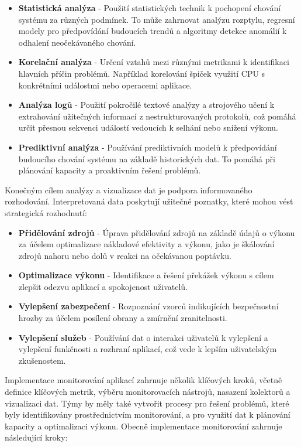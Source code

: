 \begin{itemize}
    \item \textbf{Statistická analýza} - Použití statistických technik k pochopení chování systému za různých podmínek. To může zahrnovat analýzu rozptylu, regresní modely pro předpovídání budoucích trendů a algoritmy detekce anomálií k odhalení neočekávaného chování.
    \item \textbf{Korelační analýza} - Určení vztahů mezi různými metrikami k identifikaci hlavních příčin problémů. Například korelování špiček využití CPU s konkrétními událostmi nebo operacemi aplikace.
    \item \textbf{Analýza logů} - Použití pokročilé textové analýzy a strojového učení k extrahování užitečných informací z nestrukturovaných protokolů, což pomáhá určit přesnou sekvenci událostí vedoucích k selhání nebo snížení výkonu.
    \item \textbf{Prediktivní analýza} - Používání prediktivních modelů k předpovídání budoucího chování systému na základě historických dat. To pomáhá při plánování kapacity a proaktivním řešení problémů.
\end{itemize}


Konečným cílem analýzy a vizualizace dat je podpora informovaného rozhodování. Interpretovaná data poskytují užitečné poznatky, které mohou vést strategická rozhodnutí:

\begin{itemize}
    \item \textbf{Přidělování zdrojů} - Úprava přidělování zdrojů na základě údajů o výkonu za účelem optimalizace nákladové efektivity a výkonu, jako je škálování zdrojů nahoru nebo dolů v reakci na očekávanou poptávku.
    \item \textbf{Optimalizace výkonu} - Identifikace a řešení překážek výkonu s cílem zlepšit odezvu aplikací a spokojenost uživatelů.
    \item \textbf{Vylepšení zabezpečení} - Rozpoznání vzorců indikujících bezpečnostní hrozby za účelem posílení obrany a zmírnění zranitelnosti.
    \item \textbf{Vylepšení služeb} - Používání dat o interakci uživatelů k vylepšení a vylepšení funkčnosti a rozhraní aplikací, což vede k lepším uživatelským zkušenostem.
\end{itemize}


Implementace monitorování aplikací zahrnuje několik klíčových kroků, včetně definice klíčových metrik, výběru monitorovacích nástrojů, nasazení kolektorů a vizualizaci dat. Týmy by měly také vytvořit procesy pro řešení problémů, které byly identifikovány prostřednictvím monitorování, a pro využití dat k plánování kapacity a optimalizaci výkonu. Obecně implementace monitorování zahrnuje následující kroky:

